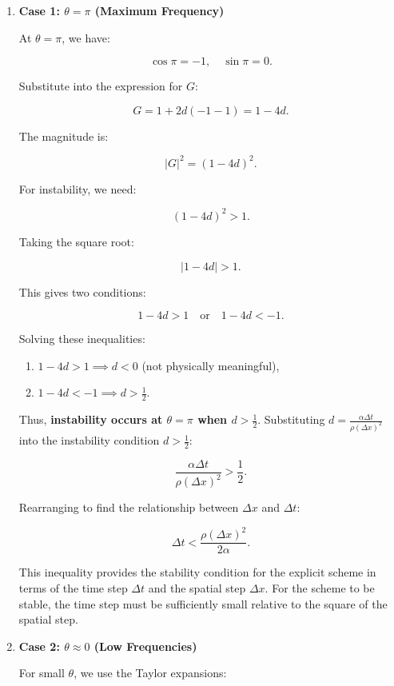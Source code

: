 \documentclass{article}
\begin{document}
\begin{enumerate}
  \item \textbf{Case 1: \( \theta = \pi \) (Maximum Frequency)}

  At \( \theta = \pi \), we have:

  \[
  \cos \pi = -1, \quad \sin \pi = 0.
  \]

  Substitute into the expression for \( G \):

  \[
  G = 1 + 2d (-1 - 1) = 1 - 4d.
  \]

  The magnitude is:

  \[
  |G|^2 = (1 - 4d)^2.
  \]

  For instability, we need:

  \[
  (1 - 4d)^2 > 1.
  \]

  Taking the square root:

  \[
  |1 - 4d| > 1.
  \]

  This gives two conditions:

  \[
  1 - 4d > 1 \quad \text{or} \quad 1 - 4d < -1.
  \]

  Solving these inequalities:

  \begin{enumerate}
    \item \( 1 - 4d > 1 \implies d < 0 \) (not physically meaningful),
    \item \( 1 - 4d < -1 \implies d > \frac{1}{2} \).
  \end{enumerate}

  Thus, \textbf{instability occurs at \( \theta = \pi \) when \( d > \frac{1}{2} \)}.
  Substituting \( d = \frac{\alpha \Delta t}{\rho (\Delta x)^2} \) into the instability condition \( d > \frac{1}{2} \):

  \[
  \frac{\alpha \Delta t}{\rho (\Delta x)^2} > \frac{1}{2}.
  \]

  Rearranging to find the relationship between \( \Delta x \) and \( \Delta t \):

  \[
  \Delta t < \frac{\rho (\Delta x)^2}{2 \alpha}.
  \]

  This inequality provides the stability condition for the explicit scheme in terms of the time step \( \Delta t \) and the spatial step \( \Delta x \). For the scheme to be stable, the time step must be sufficiently small relative to the square of the spatial step.

  \item \textbf{Case 2: \( \theta \approx 0 \) (Low Frequencies)}

  For small \( \theta \), we use the Taylor expansions:


\end{enumerate}
\end{document}

